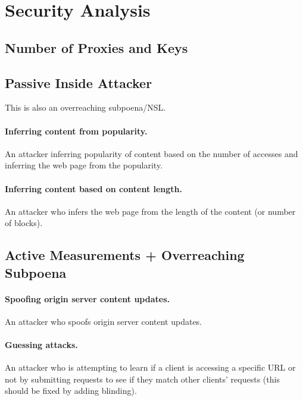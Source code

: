 \section{Security Analysis}
\label{sec:analysis}


\subsection{Number of Proxies and Keys}

\subsection{Passive Inside Attacker}
This is also an overreaching subpoena/NSL.

\paragraph{Inferring content from popularity.}
An attacker inferring popularity of content based on the number of accesses and inferring the web page from the popularity.

\paragraph{Inferring content based on content length.}
An attacker who infers the web page from the length of the content (or number of blocks).

\subsection{Active Measurements + Overreaching Subpoena}

\paragraph{Spoofing origin server content updates.}
An attacker who spoofs origin server content updates.

\paragraph{Guessing attacks.}
An attacker who is attempting to learn if a client is accessing a specific URL or not by submitting requests to see if they match other clients' requests (this should be fixed by adding blinding).
